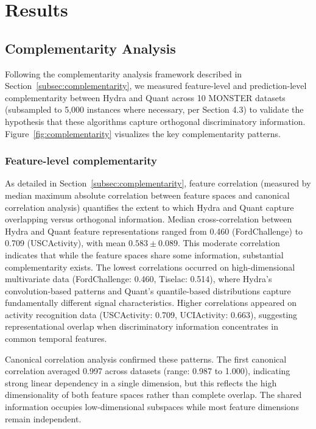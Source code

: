 \documentclass[pdflatex,sn-basic]{sn-jnl}           %
\theoremstyle{thmstyleone}%
\theoremstyle{thmstyletwo}%
\theoremstyle{thmstylethree}%
\begin{document}
\section{Results}\label{sec5}

\subsection{Complementarity Analysis}

Following the complementarity analysis framework described in Section~\ref{subsec:complementarity}, we measured feature-level and prediction-level complementarity between Hydra and Quant across 10 MONSTER datasets (subsampled to 5,000 instances where necessary, per Section 4.3) to validate the hypothesis that these algorithms capture orthogonal discriminatory information. Figure~\ref{fig:complementarity} visualizes the key complementarity patterns.

\subsubsection{Feature-level complementarity} 

As detailed in Section~\ref{subsec:complementarity}, feature correlation (measured by median maximum absolute correlation between feature spaces and canonical correlation analysis) quantifies the extent to which Hydra and Quant capture overlapping versus orthogonal information. Median cross-correlation between Hydra and Quant feature representations ranged from 0.460 (FordChallenge) to 0.709 (USCActivity), with mean $0.583 \pm 0.089$. This moderate correlation indicates that while the feature spaces share some information, substantial complementarity exists. The lowest correlations occurred on high-dimensional multivariate data (FordChallenge: 0.460, Tiselac: 0.514), where Hydra's convolution-based patterns and Quant's quantile-based distributions capture fundamentally different signal characteristics. Higher correlations appeared on activity recognition data (USCActivity: 0.709, UCIActivity: 0.663), suggesting representational overlap when discriminatory information concentrates in common temporal features.

Canonical correlation analysis confirmed these patterns. The first canonical correlation averaged 0.997 across datasets (range: 0.987 to 1.000), indicating strong linear dependency in a single dimension, but this reflects the high dimensionality of both feature spaces rather than complete overlap. The shared information occupies low-dimensional subspaces while most feature dimensions remain independent.
\end{document}
